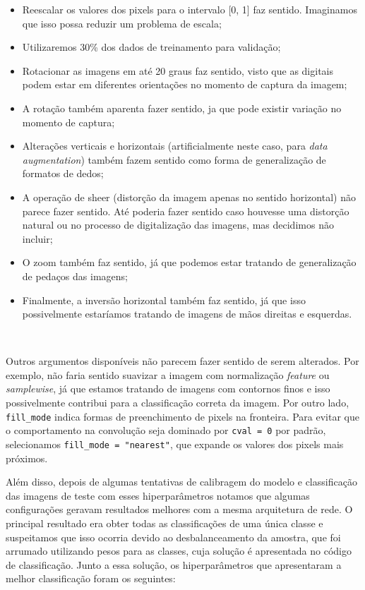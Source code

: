 \documentclass[
  a4paperpaper,
]{article}
\providecommand{\tightlist}{%
  \setlength{\itemsep}{0pt}\setlength{\parskip}{0pt}}\usepackage{longtable,booktabs,array}
\begin{document}
\begin{itemize}
\tightlist
\item
  Reescalar os valores dos pixels para o intervalo {[}0, 1{]} faz
  sentido. Imaginamos que isso possa reduzir um problema de escala;
\item
  Utilizaremos 30\% dos dados de treinamento para validação;
\item
  Rotacionar as imagens em até 20 graus faz sentido, visto que as
  digitais podem estar em diferentes orientações no momento de captura
  da imagem;
\item
  A rotação também aparenta fazer sentido, ja que pode existir variação
  no momento de captura;
\item
  Alterações verticais e horizontais (artificialmente neste caso, para
  \emph{data augmentation}) também fazem sentido como forma de
  generalização de formatos de dedos;
\item
  A operação de sheer (distorção da imagem apenas no sentido horizontal)
  não parece fazer sentido. Até poderia fazer sentido caso houvesse uma
  distorção natural ou no processo de digitalização das imagens, mas
  decidimos não incluir;
\item
  O zoom também faz sentido, já que podemos estar tratando de
  generalização de pedaços das imagens;
\item
  Finalmente, a inversão horizontal também faz sentido, já que isso
  possivelmente estaríamos tratando de imagens de mãos direitas e
  esquerdas.
\end{itemize}

~

Outros argumentos disponíveis não parecem fazer sentido de serem
alterados. Por exemplo, não faria sentido suavizar a imagem com
normalização \emph{feature} ou \emph{samplewise}, já que estamos
tratando de imagens com contornos finos e isso possivelmente contribui
para a classificação correta da imagem. Por outro lado,
\texttt{fill\_mode} indica formas de preenchimento de pixels na
fronteira. Para evitar que o comportamento na convolução seja dominado
por \texttt{cval\ =\ 0} por padrão, selecionamos
\texttt{fill\_mode\ =\ "nearest"}, que expande os valores dos pixels
mais próximos.

Além disso, depois de algumas tentativas de calibragem do modelo e
classificação das imagens de teste com esses hiperparâmetros notamos que
algumas configurações geravam resultados melhores com a mesma
arquitetura de rede. O principal resultado era obter todas as
classificações de uma única classe e suspeitamos que isso ocorria devido
ao desbalanceamento da amostra, que foi arrumado utilizando pesos para
as classes, cuja solução é apresentada no código de classificação. Junto
a essa solução, os hiperparâmetros que apresentaram a melhor
classificação foram os seguintes:
\end{document}
